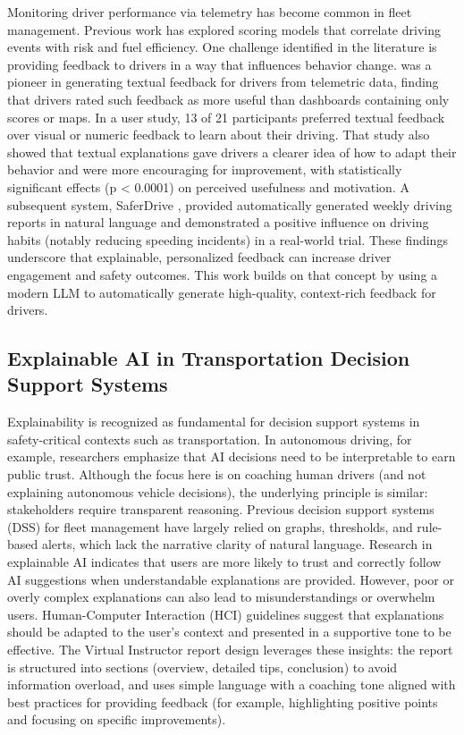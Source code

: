 \documentclass[12pt]{article}
\begin{document}
Monitoring driver performance via telemetry has become common in fleet management. Previous work has explored scoring models that correlate driving events with risk and fuel efficiency. One challenge identified in the literature is providing feedback to drivers in a way that influences behavior change. \cite{braun2015} was a pioneer in generating textual feedback for drivers from telemetric data, finding that drivers rated such feedback as more useful than dashboards containing only scores or maps. In a user study, 13 of 21 participants preferred textual feedback over visual or numeric feedback to learn about their driving. That study also showed that textual explanations gave drivers a clearer idea of how to adapt their behavior and were more encouraging for improvement, with statistically significant effects (p < 0.0001) on perceived usefulness and motivation. A subsequent system, SaferDrive \cite{saferdrive2017}, provided automatically generated weekly driving reports in natural language and demonstrated a positive influence on driving habits (notably reducing speeding incidents) in a real-world trial. These findings underscore that explainable, personalized feedback can increase driver engagement and safety outcomes. This work builds on that concept by using a modern LLM to automatically generate high-quality, context-rich feedback for drivers.

\subsection{Explainable AI in Transportation Decision Support Systems}

Explainability is recognized as fundamental for decision support systems in safety-critical contexts such as transportation. In autonomous driving, for example, researchers emphasize that AI decisions need to be interpretable to earn public trust. Although the focus here is on coaching human drivers (and not explaining autonomous vehicle decisions), the underlying principle is similar: stakeholders require transparent reasoning. Previous decision support systems (DSS) for fleet management have largely relied on graphs, thresholds, and rule-based alerts, which lack the narrative clarity of natural language. Research in explainable AI indicates that users are more likely to trust and correctly follow AI suggestions when understandable explanations are provided. However, poor or overly complex explanations can also lead to misunderstandings or overwhelm users. Human-Computer Interaction (HCI) guidelines suggest that explanations should be adapted to the user’s context and presented in a supportive tone to be effective. The Virtual Instructor report design leverages these insights: the report is structured into sections (overview, detailed tips, conclusion) to avoid information overload, and uses simple language with a coaching tone aligned with best practices for providing feedback (for example, highlighting positive points and focusing on specific improvements).
\end{document}
